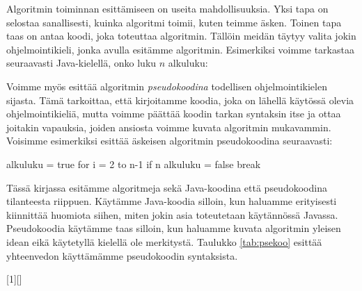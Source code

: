 Algoritmin toiminnan esittämiseen on useita mahdollisuuksia.
Yksi tapa on selostaa sanallisesti, kuinka algoritmi toimii,
kuten teimme äsken.
Toinen tapa taas on antaa koodi, joka toteuttaa algoritmin.
Tällöin meidän täytyy valita jokin ohjelmointikieli,
jonka avulla esitämme algoritmin.
Esimerkiksi voimme tarkastaa seuraavasti Java-kielellä,
onko luku $n$ alkuluku:


Voimme myös esittää algoritmin \emph{pseudokoodina}
todellisen ohjelmointikielen sijasta.
Tämä tarkoittaa, että kirjoitamme koodia,
joka on lähellä käytössä olevia ohjelmointikieliä, mutta voimme
päättää koodin tarkan syntaksin itse ja ottaa joitakin vapauksia,
joiden ansiosta voimme kuvata algoritmin mukavammin.
Voisimme esimerkiksi esittää äskeisen algoritmin pseudokoodina seuraavasti:

\begin{code}
alkuluku = true
for i = 2 to n-1
    if n%
        alkuluku = false
        break
\end{code}

Tässä kirjassa esitämme algoritmeja sekä Java-koodina että pseudokoodina
tilanteesta riippuen.
Käytämme Java-koodia silloin, kun haluamme erityisesti kiinnittää huomiota siihen,
miten jokin asia toteutetaan käytännössä Javassa.
Pseudokoodia käytämme taas silloin, kun haluamme kuvata algoritmin yleisen
idean eikä käytetyllä kielellä ole merkitystä.
Taulukko \ref{tab:psekoo} esittää yhteenvedon käyttämämme pseudokoodin syntaksista.

[1][]%
{
   \noindent
   \small
   \vspace{0.5\baselineskip}
   \lstset{#1,xleftmargin=0pt}}
{\endminipage}


